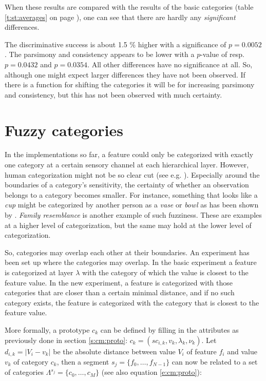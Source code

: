 When these results are compared with the results of the basic categories (table \ref{t:st:averages} on page \pageref{t:st:averages}), one can see that there are hardly any {\em significant} differences.

The discriminative success is about 1.5 \% higher with a significance of $p=0.0052$. The parsimony and consistency appears to be lower with a $p$-value of resp. $p=0.0432$ and $p=0.0354$. All other differences have no significance at all. So, although one might expect larger differences they have not been observed. If there is a function for shifting the categories it will be for increasing parsimony and consistency, but this has not been observed with much certainty.

\section{Fuzzy categories}\label{s:cat:fs}

In the implementations so far, a feature could only be categorized with exactly one category at a certain sensory channel at each hierarchical layer. However, human categorization might not be so clear cut (see e.g. \cite{aitchison:1994}). Especially around the boundaries of a category's sensitivity, the certainty of whether an observation belongs to a category becomes smaller. For instance, something that looks like a {\em cup} might be categorized by another person as a {\em vase} or {\em bowl} as has been shown by \cite{labov:1973}. {\em Family resemblance} \cite{wittgenstein:1958} is another example of such fuzziness.  These are examples at a higher level of categorization, but the same may hold at the lower level of categorization.

So, categories may overlap each other at their boundaries. An experiment has been set up where the categories may overlap. In the basic experiment a feature is categorized at layer $\lambda$ with the category of which the value is closest to the feature value. In the new experiment, a feature is categorized with those categories that are closer than a certain minimal distance, and if no such category exists, the feature is categorized with the category that is closest to the feature value. 

More formally, a prototype $c_k$ can be defined by filling in the attributes as previously done in section \ref{s:cm:proto}: $c_k = (sc_{i,k}, v_k, \lambda_k, \nu_k)$. Let $d_{i,k}=|V_i-v_k|$ be the absolute distance between value $V_i$ of feature $f_i$ and value $v_k$ of category $c_k$, then a segment $s_j=\{f_0,\ldots,f_{N-1}\}$ can now be related to a set of categories $\Lambda^{s_j}=\{c_0,\ldots,c_M\}$ (see also equation \ref{e:cm:proto}):

